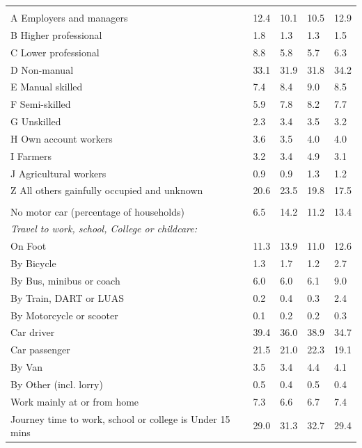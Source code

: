 \documentclass{article}
\begin{document}
\begin{table}[h]
\begin{tabular}{KTTTT}
\hline
    \\ 
    \hline
A Employers and managers & 12.4& 10.1& 10.5& 12.9\\
B Higher professional & 1.8& 1.3& 1.3& 1.5\\
C Lower professional & 8.8& 5.8& 5.7& 6.3\\
D Non-manual & 33.1& 31.9& 31.8& 34.2\\
E Manual skilled & 7.4& 8.4& 9.0& 8.5\\
F Semi-skilled & 5.9& 7.8& 8.2& 7.7\\
G Unskilled & 2.3& 3.4& 3.5& 3.2\\
H Own account workers & 3.6& 3.5& 4.0& 4.0\\
I Farmers & 3.2& 3.4& 4.9& 3.1\\
J Agricultural workers & 0.9& 0.9& 1.3& 1.2\\
Z All others gainfully occupied and unknown & 20.6& 23.5& 19.8& 17.5\\
\hline
{}\hline
    \\ 
    \hline
No motor car (percentage of households) &  6.5& 14.2& 11.2& 
13.4\\
    \hline 
\emph{Travel to work, school, College or childcare:} & & & \\
\quad On Foot & 11.3& 13.9& 11.0& 12.6\\ 
\quad By Bicycle & 1.3& 1.7& 1.2& 2.7\\ 
\quad By Bus, minibus or coach & 6.0& 6.0& 6.1& 9.0\\
\quad By Train, DART or LUAS & 0.2& 0.4& 0.3& 2.4\\
\quad By Motorcycle or scooter & 0.1& 0.2& 0.2& 0.3\\
\quad Car driver & 39.4 & 36.0& 38.9& 34.7\\
\quad Car passenger & 21.5& 21.0& 22.3& 19.1\\
\quad By Van & 3.5& 3.4& 4.4& 4.1\\
\quad By Other (incl. lorry) & 0.5& 0.4& 0.5& 0.4\\
    \hline
Work mainly at or from home & 7.3& 6.6& 6.7& 7.4\\
Journey time to work, school or college is Under 15 mins & 29.0& 31.3& 32.7& 29.4\\

\end{tabular}
\end{table}
\end{document}
